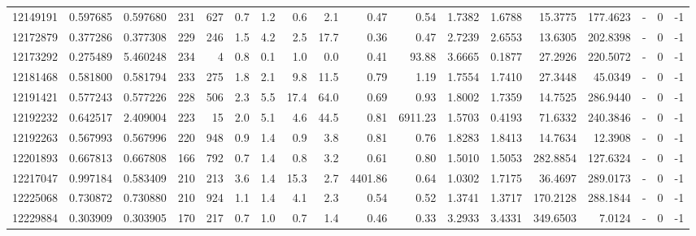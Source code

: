 \begin{tabular}{rrrrrrrrrrrrrrrlrr}
  12149191 & 0.597685 &   0.597680 &  231 &  627 &      0.7 &      1.2 &     0.6 &      2.1 &       0.47 &        0.54 &  1.7382 &  1.6788 &   15.3775 &  177.4623 &             - &        0 &         -1 \\
  12172879 & 0.377286 &   0.377308 &  229 &  246 &      1.5 &      4.2 &     2.5 &     17.7 &       0.36 &        0.47 &  2.7239 &  2.6553 &   13.6305 &  202.8398 &             - &        0 &         -1 \\
  12173292 & 0.275489 &   5.460248 &  234 &    4 &      0.8 &      0.1 &     1.0 &      0.0 &       0.41 &       93.88 &  3.6665 &  0.1877 &   27.2926 &  220.5072 &             - &        0 &         -1 \\
  12181468 & 0.581800 &   0.581794 &  233 &  275 &      1.8 &      2.1 &     9.8 &     11.5 &       0.79 &        1.19 &  1.7554 &  1.7410 &   27.3448 &   45.0349 &             - &        0 &         -1 \\
  12191421 & 0.577243 &   0.577226 &  228 &  506 &      2.3 &      5.5 &    17.4 &     64.0 &       0.69 &        0.93 &  1.8002 &  1.7359 &   14.7525 &  286.9440 &             - &        0 &         -1 \\
  12192232 & 0.642517 &   2.409004 &  223 &   15 &      2.0 &      5.1 &     4.6 &     44.5 &       0.81 &     6911.23 &  1.5703 &  0.4193 &   71.6332 &  240.3846 &             - &        0 &         -1 \\
  12192263 & 0.567993 &   0.567996 &  220 &  948 &      0.9 &      1.4 &     0.9 &      3.8 &       0.81 &        0.76 &  1.8283 &  1.8413 &   14.7634 &   12.3908 &             - &        0 &         -1 \\
  12201893 & 0.667813 &   0.667808 &  166 &  792 &      0.7 &      1.4 &     0.8 &      3.2 &       0.61 &        0.80 &  1.5010 &  1.5053 &  282.8854 &  127.6324 &             - &        0 &         -1 \\
  12217047 & 0.997184 &   0.583409 &  210 &  213 &      3.6 &      1.4 &    15.3 &      2.7 &    4401.86 &        0.64 &  1.0302 &  1.7175 &   36.4697 &  289.0173 &             - &        0 &         -1 \\
  12225068 & 0.730872 &   0.730880 &  210 &  924 &      1.1 &      1.4 &     4.1 &      2.3 &       0.54 &        0.52 &  1.3741 &  1.3717 &  170.2128 &  288.1844 &             - &        0 &         -1 \\
  12229884 & 0.303909 &   0.303905 &  170 &  217 &      0.7 &      1.0 &     0.7 &      1.4 &       0.46 &        0.33 &  3.2933 &  3.4331 &  349.6503 &    7.0124 &             - &        0 &         -1 \\

\end{tabular}
